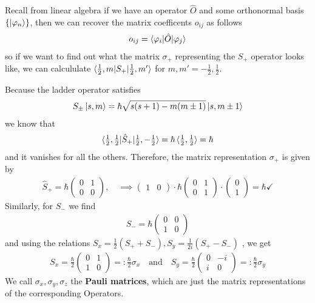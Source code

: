Recall from linear algebra if we have an operator $\hat{O}$ and some orthonormal basis $\{\ket{\varphi_n}\}$, then we can recover the matrix coefficents $o_{ij}$ as follows
\begin{align*}
  o_{ij} = \braket{\varphi_i| \hat{O}|\varphi_j}
\end{align*}
so if we want to find out what the matrix $\sigma_{+}$ representing the $S_+$ operator looks like, we can calcululate $\braket{\tfrac{1}{2},m | S_+| \tfrac{1}{2}, m'}$ for $m,m' = - \tfrac{1}{2}, \tfrac{1}{2}$.

Because the ladder operator satisfies
\begin{align*}
  S_{\pm} \ket{s,m} = \hbar \sqrt{s(s+1) - m(m\pm 1)} \ket{s, m \pm 1}
\end{align*}
we know that
\begin{align*}
  \braket{\tfrac{1}{2}, \tfrac{1}{2}|\hat{S}_+|\tfrac{1}{2},-\tfrac{1}{2}} =  \hbar \braket{\tfrac{1}{2},\tfrac{1}{2}} = \hbar
\end{align*}
and it vanishes for all the others. Therefore, the matrix representation $\sigma_+$ is given by
\begin{align*}
  \hat{S}_+ = \hbar \begin{pmatrix}
  0 & 1\\
  0 & 0
  \end{pmatrix}, \quad \implies
  \begin{pmatrix}
  1 & 0
  \end{pmatrix}
  \cdot \hbar \begin{pmatrix}
  0 & 1\\
  0 & 1
  \end{pmatrix}
  \cdot \begin{pmatrix}
  0 \\ 1
  \end{pmatrix}
  = \hbar \checkmark
\end{align*}
Similarly, for $S_-$ we find 
\begin{align*}
  S_- = \hbar \begin{pmatrix}
  0 & 0\\
  1 & 0
  \end{pmatrix}
\end{align*}
and using the relations 
$S_x = \frac{1}{2}\left(S_+ + S_-\right), 
S_y = \frac{1}{2i}\left(S_+ - S_-\right)$
, we get 
\begin{align*}
  S_x = \frac{\hbar}{2}\begin{pmatrix}
   0 & 1\\
   1 & 0
  \end{pmatrix}
  =: \frac{\hbar}{2} \sigma_x \quad \text{and} \quad S_y = \frac{\hbar}{2} 
  \begin{pmatrix}
    0 & -i\\ i & 0
  \end{pmatrix}
  =: \frac{\hbar}{2}\sigma_y
  \end{align*}
We call $\sigma_x, \sigma_y, \sigma_z$ the \textbf{Pauli matrices}, which are just the matrix representations of the corresponding Operators.

